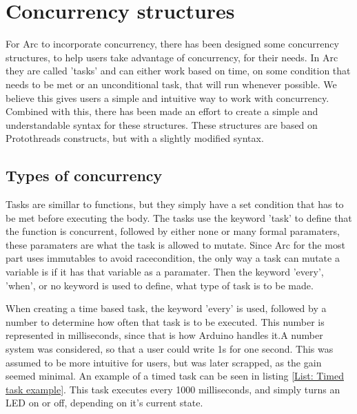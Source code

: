 
\section{Concurrency structures}\label{sec:concurrency structures}
For Arc to incorporate concurrency, there has been designed some concurrency structures, to help users take advantage of concurrency, for their needs. In Arc they are called 'tasks' and can either work based on time, on some condition that needs to be met or an unconditional task, that will run whenever possible. We believe this gives users a simple and intuitive way to work with concurrency. Combined with this, there has been made an effort to create a simple and understandable syntax for these structures. These structures are based on Protothreads constructs, but with a slightly modified syntax.


\subsection{Types of concurrency}
Tasks are simillar to functions, but they simply have a set condition that has to be met before executing the body. The tasks use the keyword 'task' to define that the function is concurrent, followed by either none or many formal paramaters, these paramaters are what the task is allowed to mutate. Since Arc for the most part uses immutables to avoid racecondition, the only way a task can mutate a variable is if it has that variable as a paramater. Then the keyword 'every', 'when', or no keyword is used to define, what type of task is to be made.

When creating a time based task, the keyword 'every' is used, followed by a number to determine how often that task is to be executed. This number is represented in milliseconds, since that is how Arduino handles it.A number system was considered, so that a user could write 1s for one second. This was assumed to be more intuitive for users, but was later scrapped, as the gain seemed minimal.
An example of a timed task can be seen in listing \ref*{List: Timed task example}. This task executes every 1000 milliseconds, and simply turns an LED on or off, depending on it's current state.

